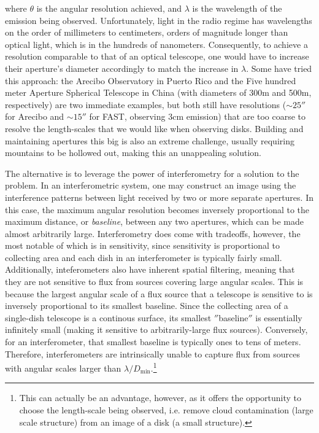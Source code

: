 \noindent where $\theta$ is the angular resolution achieved, and $\lambda$ is the wavelength of the emission being observed. Unfortunately, light in the radio regime has wavelengths on the order of millimeters to centimeters, orders of magnitude longer than optical light, which is in the hundreds of nanometers. Consequently, to achieve a resolution comparable to that of an optical telescope, one would have to increase their aperture's diameter accordingly to match the increase in $\lambda$. Some have tried this approach: the Arecibo Observatory in Puerto Rico and the Five hundred meter Aperture Spherical Telescope in China (with diameters of 300m and 500m, respectively) are two immediate examples, but both still have resolutions ($\sim25''$ for Arecibo and $\sim15''$ for FAST, observing 3cm emission) that are too coarse to resolve the length-scales that we would like when observing disks. Building and maintaining apertures this big is also an extreme challenge, usually requiring mountains to be hollowed out, making this an unappealing solution.


The alternative is to leverage the power of interferometry for a solution to the problem. In an interferometric system, one may construct an image using the interference patterns between light received by two or more separate apertures. In this case, the maximum angular resolution becomes inversely proportional to the maximum distance, or \textit{baseline}, between any two  apertures, which can be made almost arbitrarily large. Interferometry does come with tradeoffs, however, the most notable of which is in sensitivity, since sensitivity is proportional to collecting area and each dish in an interferometer is typically fairly small. Additionally, inteferometers also have inherent spatial filtering, meaning that they are not sensitive to flux from sources covering large angular scales. This is because the largest angular scale of a flux source that a telescope is sensitive to is inversely proportional to its smallest baseline. Since the collecting area of a single-dish telescope is a continous surface, its smallest $''$baseline$''$ is essentially infinitely small (making it sensitive to arbitrarily-large flux sources). Conversely, for an interferometer, that smallest baseline is typically ones to tens of meters. Therefore, interferometers are intrinsically unable to capture flux from sources with angular scales larger than $\lambda/D_\text{min}$.\footnote{This can actually be an advantage, however, as it offers the opportunity to choose the length-scale being observed, i.e. remove cloud contamination (large scale structure) from an image of a disk (a small structure).}


